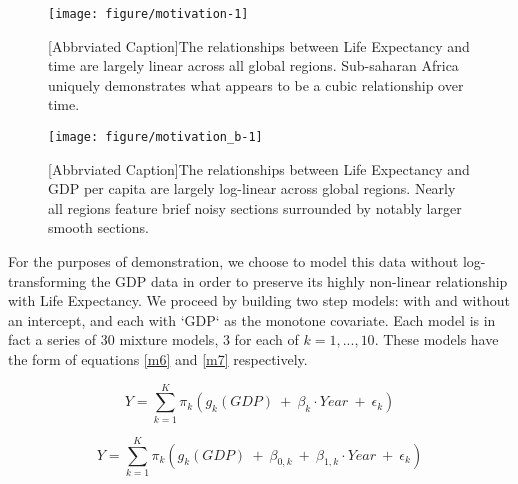 \documentclass[10pt]{olplainarticle}\usepackage[]{graphicx}\usepackage[]{color}
\makeatletter
\def\maxwidth{ %
  \ifdim\Gin@nat@width>\linewidth
    \linewidth
  \else
    \Gin@nat@width
  \fi
}
\newenvironment{knitrout}{}{} %
\makeatother
\begin{document}
\begin{figure}[H]
\begin{knitrout}
\color{fgcolor}

{\centering \texttt{[image: figure/motivation-1]} 

}



\end{knitrout}

[Abbrviated Caption]{The relationships between Life Expectancy and time are largely linear across all global regions. Sub-saharan Africa uniquely demonstrates what appears to be a cubic relationship over time.} \label{lexy}
\end{figure}

\begin{figure}[H]
\begin{knitrout}
\color{fgcolor}

{\centering \texttt{[image: figure/motivation\_b-1]} 

}



\end{knitrout}
[Abbrviated Caption]{The relationships between Life Expectancy and GDP per capita are largely log-linear across global regions. Nearly all regions feature brief noisy sections surrounded by notably larger smooth sections.}  \label{lexgdp}
\end{figure}

For the purposes of demonstration, we choose to model this data without log-transforming the GDP data in order to preserve its highly non-linear relationship with Life Expectancy. We proceed by building two step models: with and without an intercept, and each with `GDP` as the monotone covariate. Each model is in fact a series of 30 mixture models, 3 for each of $k = 1,...,10$. These models have the form of equations \ref{m6} and \ref{m7} respectively.

\begin{equation} \label{m6}
  Y = \sum_{k=1}^{K}\pi_k (g_{k} (GDP) \ +\  \beta_{k}\cdot Year \ +\ \epsilon_k)
\end{equation}

\begin{equation} \label{m7}
  Y = \sum_{k=1}^{K}\pi_k (g_{k} (GDP) \ +\  \beta_{0,k} \ +\ \beta_{1,k}\cdot Year \ +\ \epsilon_k)
\end{equation}
\end{document}
